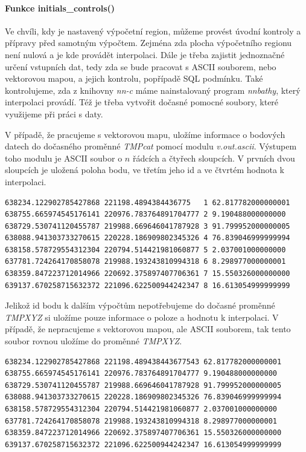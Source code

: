 \documentclass[12pt,a4paper]{article}
\begin{document}
\bigskip
\paragraph{Funkce initials\_controls()}
Ve chvíli, kdy je nastavený výpočetní region, můžeme provést úvodní kontroly a přípravy před samotným výpočtem. Zejména zda plocha výpočetního regionu není nulová a je kde provádět interpolaci. Dále je třeba zajistit jednoznačné určení vstupních dat, tedy zda se bude pracovat s ASCII souborem, nebo vektorovou mapou, a jejich kontrolu, popřípadě SQL podmínku. Také kontrolujeme, zda z knihovny \emph{nn-c} máme nainstalovaný program \emph{nnbathy}, který interpolaci provádí. Též je třeba vytvořit dočasné pomocné soubory, které využijeme při práci s daty. 

V případě, že pracujeme s vektorovou mapu, uložíme informace o bodových datech do dočasného proměnné \emph{TMPcat} pomocí modulu \emph{v.out.ascii}. Výstupem toho modulu je ASCII soubor o $n$ řádcích a čtyřech sloupcích. V prvních dvou sloupcích je uložená poloha bodu, ve třetím jeho id a ve čtvrtém hodnota k interpolaci. 

\bigskip
\lstset{basicstyle=\footnotesize}
\begin{lstlisting}[caption={Pomocný soubor TMPcat}]
638234.122902785427868 221198.4894384436775   1 62.817782000000001
638755.665974545176141 220976.783764891704777 2 9.190488000000000
638729.530741120455787 219988.669646041787928 3 91.799952000000005
638088.941303733270615 220228.186909802345326 4 76.839046999999994
638158.578729554312304 220794.514421981060877 5 2.037001000000000
637781.724264170858078 219988.193243810994318 6 8.298977000000001
638359.847223712014966 220692.375897407706361 7 15.550326000000000
639137.670258715632372 221096.622500944242347 8 16.613054999999999
\end{lstlisting}

Jelikož id bodu k dalším výpočtům nepotřebujeme do dočasné proměnné \emph{TMPXYZ} si uložíme pouze informace o poloze a hodnotu k interpolaci. V případě, že nepracujeme s vektorovou mapou, ale ASCII souborem, tak tento soubor rovnou uložíme do proměnné \emph{TMPXYZ}.

\bigskip
\lstset{basicstyle=\footnotesize}
\begin{lstlisting}[caption={Pomocný soubor TMPXYZ}]
638234.122902785427868 221198.489438443677543 62.817782000000001
638755.665974545176141 220976.783764891704777 9.190488000000000
638729.530741120455787 219988.669646041787928 91.799952000000005
638088.941303733270615 220228.186909802345326 76.839046999999994
638158.578729554312304 220794.514421981060877 2.037001000000000
637781.724264170858078 219988.193243810994318 8.298977000000001
638359.847223712014966 220692.375897407706361 15.550326000000000
639137.670258715632372 221096.622500944242347 16.613054999999999
\end{lstlisting}
\end{document}
